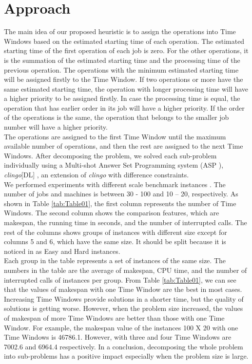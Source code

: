 \documentclass[runningheads]{llncs}
\begin{document}
\section{Approach}
The main idea of our proposed heuristic is to assign the operations into Time Windows based on the estimated starting time of each operation. The estimated starting time of the first operation of each job is zero. For the other operations, it is the summation of the estimated starting time and the processing time of the previous operation. The operations with the minimum estimated starting time will be assigned firstly to the Time Window. If two operations or more have the same estimated starting time, the operation with longer processing time will have a higher priority to be assigned firstly. In case the processing time is equal, the operation that has earlier order in its job will have a higher priority. If the order of the operations is the same, the operation that belongs to the smaller job number will have a higher priority.\\ 
The operations are assigned to the first Time Window until the maximum available number of operations, and then the rest are assigned to the next Time Windows. After decomposing the problem, we solved each sub-problem individually using a Multi-shot Answer Set Programming system (ASP \cite{lifschitz1999answer,gebser2019multi}), \textit{clingo}[DL] \cite{janhunen2017clingo}, an extension of \textit{clingo} \cite{gebser2019multi} with difference constraints. \\
We performed experiments with different scale benchmark instances \cite{taillard1993benchmarks,storer1992new}. The number of jobs and machines is between 30 - 100 and 10 – 20, respectively. As shown in Table \ref{tab:Table01}, the first column represents the number of Time Windows. The second column shows the comparison features, which are makespan, the running time in seconds, and the number of interrupted calls. The rest of the columns shows groups of instances with different size except for columns 5 and 6, which have the same size. It should be split because it is noticed in \cite{storer1992new} as Easy and Hard instances.\\ 
Each group in the table represents a set of instances of the same size. The numbers in the table are the average of makespan, CPU time, and the number of interrupted calls of instances per group. From Table \ref{tab:Table01}, we can see that the values of makespan with one Time Window are the best in most cases. Increasing Time Windows provide solutions in a shorter time, but the quality of solutions is getting worse. However, when the problem size increased, the values of makespan of more Time Windows are better than those with one Time Window. For example, the makespan value of the instances 100 X 20 with one Time Windows is 46786.1. However, with three and four Time Windows are 7002.6 and 6964.4 respectively. In a conclusion, decomposing the whole problem into sub-problems has a positive impact especially when the problem size is large.


\newpage
\appendix
\end{document}
